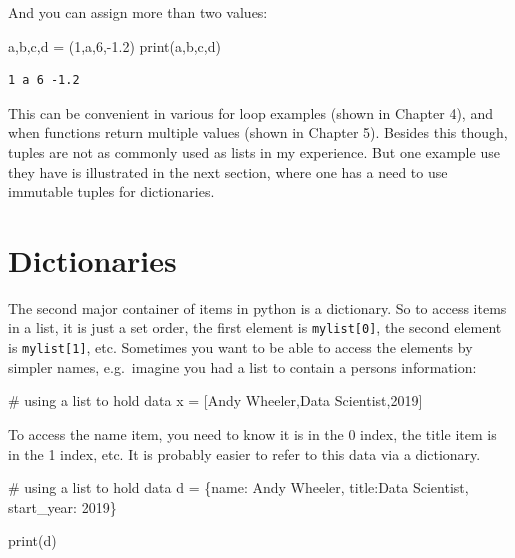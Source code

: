\documentclass[
  letterpaper,
]{scrbook}
\newenvironment{Shaded}{\begin{snugshade}}{\end{snugshade}}
\newcommand{\BuiltInTok}[1]{\textcolor[rgb]{0.00,0.23,0.31}{#1}}
\newcommand{\CommentTok}[1]{\textcolor[rgb]{0.37,0.37,0.37}{#1}}
\newcommand{\DecValTok}[1]{\textcolor[rgb]{0.68,0.00,0.00}{#1}}
\newcommand{\FloatTok}[1]{\textcolor[rgb]{0.68,0.00,0.00}{#1}}
\newcommand{\NormalTok}[1]{\textcolor[rgb]{0.00,0.23,0.31}{#1}}
\newcommand{\OperatorTok}[1]{\textcolor[rgb]{0.37,0.37,0.37}{#1}}
\newcommand{\StringTok}[1]{\textcolor[rgb]{0.13,0.47,0.30}{#1}}
\begin{document}
And you can assign more than two values:

\begin{Shaded}
\begin{Highlighting}[]
\NormalTok{a,b,c,d }\OperatorTok{=}\NormalTok{ (}\DecValTok{1}\NormalTok{,}\StringTok{\textquotesingle{}a\textquotesingle{}}\NormalTok{,}\DecValTok{6}\NormalTok{,}\OperatorTok{{-}}\FloatTok{1.2}\NormalTok{)}
\BuiltInTok{print}\NormalTok{(a,b,c,d)}
\end{Highlighting}
\end{Shaded}

\begin{verbatim}
1 a 6 -1.2
\end{verbatim}

This can be convenient in various for loop examples (shown in Chapter
4), and when functions return multiple values (shown in Chapter 5).
Besides this though, tuples are not as commonly used as lists in my
experience. But one example use they have is illustrated in the next
section, where one has a need to use immutable tuples for dictionaries.

\section{Dictionaries}\label{dictionaries}

The second major container of items in python is a dictionary. So to
access items in a list, it is just a set order, the first element is
\texttt{mylist{[}0{]}}, the second element is \texttt{mylist{[}1{]}},
etc. Sometimes you want to be able to access the elements by simpler
names, e.g.~imagine you had a list to contain a persons information:

\begin{Shaded}
\begin{Highlighting}[]
\CommentTok{\# using a list to hold data}
\NormalTok{x }\OperatorTok{=}\NormalTok{ [}\StringTok{\textquotesingle{}Andy Wheeler\textquotesingle{}}\NormalTok{,}\StringTok{\textquotesingle{}Data Scientist\textquotesingle{}}\NormalTok{,}\StringTok{\textquotesingle{}2019\textquotesingle{}}\NormalTok{]}
\end{Highlighting}
\end{Shaded}

To access the name item, you need to know it is in the 0 index, the
title item is in the 1 index, etc. It is probably easier to refer to
this data via a dictionary.

\begin{Shaded}
\begin{Highlighting}[]
\CommentTok{\# using a list to hold data}
\NormalTok{d }\OperatorTok{=}\NormalTok{ \{}\StringTok{\textquotesingle{}name\textquotesingle{}}\NormalTok{: }\StringTok{\textquotesingle{}Andy Wheeler\textquotesingle{}}\NormalTok{,}
     \StringTok{\textquotesingle{}title\textquotesingle{}}\NormalTok{:}\StringTok{\textquotesingle{}Data Scientist\textquotesingle{}}\NormalTok{,}
     \StringTok{\textquotesingle{}start\_year\textquotesingle{}}\NormalTok{: }\DecValTok{2019}\NormalTok{\}}

\BuiltInTok{print}\NormalTok{(d)}
\end{Highlighting}
\end{Shaded}
\end{document}
